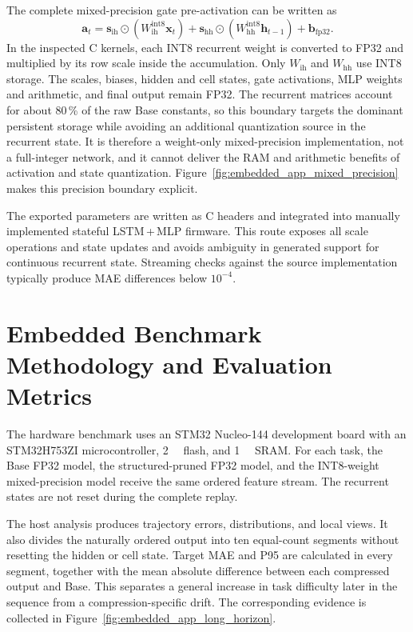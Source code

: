 \documentclass[
    a4paper,
    12pt,
    titlepage,
    bibliography=totoc,
    twoside=on,
    parskip=false,
    numbers=noenddot,
    cleardoublepage=empty,
    DIV=12,
    BCOR=12.0mm,
    headheight=36pt,
    headings=openright
]{scrreprt}
\begin{document}
The complete mixed-precision gate pre-activation can be written as
\begin{equation}
    \mathbf a_t=
    \mathbf s_{\mathrm{ih}}\odot
    \left(W_{\mathrm{ih}}^{\mathrm{int8}}\mathbf x_t\right)
    +\mathbf s_{\mathrm{hh}}\odot
    \left(W_{\mathrm{hh}}^{\mathrm{int8}}\mathbf h_{t-1}\right)
    +\mathbf b_{\mathrm{fp32}}.
    \label{eq:embedded_quant_gate}
\end{equation}
In the inspected C kernels, each INT8 recurrent weight is converted to FP32 and multiplied by its row scale inside the accumulation. Only $W_{\mathrm{ih}}$ and $W_{\mathrm{hh}}$ use INT8 storage. The scales, biases, hidden and cell states, gate activations, MLP weights and arithmetic, and final output remain FP32. The recurrent matrices account for about 80\,\% of the raw Base constants, so this boundary targets the dominant persistent storage while avoiding an additional quantization source in the recurrent state. It is therefore a weight-only mixed-precision implementation, not a full-integer network, and it cannot deliver the RAM and arithmetic benefits of activation and state quantization. Figure~\ref{fig:embedded_app_mixed_precision} makes this precision boundary explicit.

The exported parameters are written as C headers and integrated into manually implemented stateful LSTM\,+\,MLP firmware. This route exposes all scale operations and state updates and avoids ambiguity in generated support for continuous recurrent state.\autocite{ONNXRuntimeHighperformance,NVIDIATensorRTHighPerformance,XCUBEAISTM32CubeExpansion} Streaming checks against the source implementation typically produce MAE differences below $10^{-4}$.

\section{Embedded Benchmark Methodology and Evaluation Metrics}
The hardware benchmark uses an STM32 Nucleo-144 development board with an STM32H753ZI microcontroller, \SI{2}{\mega\byte} flash, and \SI{1}{\mega\byte} SRAM.\autocite{STM32Nucleo144Boards2025_Datasheet,naguibMicroprocessorExecutionTime2022} For each task, the Base FP32 model, the structured-pruned FP32 model, and the INT8-weight mixed-precision model receive the same ordered feature stream. The recurrent states are not reset during the complete replay.

The host analysis produces trajectory errors, distributions, and local views. It also divides the naturally ordered output into ten equal-count segments without resetting the hidden or cell state. Target MAE and P95 are calculated in every segment, together with the mean absolute difference between each compressed output and Base. This separates a general increase in task difficulty later in the sequence from a compression-specific drift. The corresponding evidence is collected in Figure~\ref{fig:embedded_app_long_horizon}.
\end{document}
